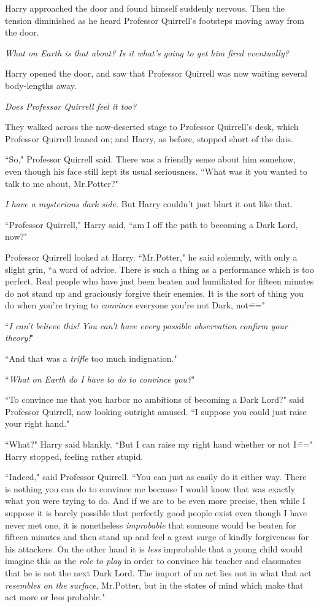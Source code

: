 Harry approached the door and found himself suddenly nervous. Then the tension diminished as he heard Professor Quirrell's footsteps moving away from the door.

\emph{What on Earth is that about? Is it what's going to get him fired eventually?}

Harry opened the door, and saw that Professor Quirrell was now waiting several body-lengths away.

\emph{Does Professor Quirrell feel it too?}

They walked across the now-deserted stage to Professor Quirrell's desk, which Professor Quirrell leaned on; and Harry, as before, stopped short of the dais.

``So," Professor Quirrell said. There was a friendly sense about him somehow, even though his face still kept its usual seriousness. ``What was it you wanted to talk to me about, Mr.\?Potter?"

\emph{I have a mysterious dark side.} But Harry couldn't just blurt it out like that.

``Professor Quirrell," Harry said, ``am I off the path to becoming a Dark Lord, now?"

Professor Quirrell looked at Harry. ``Mr.\?Potter," he said solemnly, with only a slight grin, ``a word of advice. There is such a thing as a performance which is too perfect. Real people who have just been beaten and humiliated for fifteen minutes do not stand up and graciously forgive their enemies. It is the sort of thing you do when you're trying to \emph{convince} everyone you're not Dark, not\==="

``\emph{I can't believe this! You can't have every possible observation confirm your theory!}"

``And that was a \emph{trifle} too much indignation."

``\emph{What on Earth do I have to do to convince you?}"

``To convince me that you harbor no ambitions of becoming a Dark Lord?" said Professor Quirrell, now looking outright amused. ``I suppose you could just raise your right hand."

``What?" Harry said blankly. ``But I can raise my right hand whether or not I\===" Harry stopped, feeling rather stupid.

``Indeed," said Professor Quirrell. ``You can just as easily do it either way. There is nothing you can do to convince me because I would know that was exactly what you were trying to do. And if we are to be even more precise, then while I suppose it is barely possible that perfectly good people exist even though I have never met one, it is nonetheless \emph{improbable} that someone would be beaten for fifteen minutes and then stand up and feel a great surge of kindly forgiveness for his attackers. On the other hand it is \emph{less} improbable that a young child would imagine this as the \emph{role to play} in order to convince his teacher and classmates that he is not the next Dark Lord. The import of an act lies not in what that act \emph{resembles on the surface}, Mr.\?Potter, but in the states of mind which make that act more or less probable."

